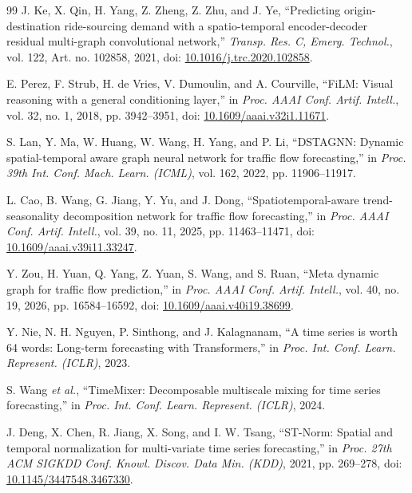 \begin{thebibliography}{99}
J. Ke, X. Qin, H. Yang, Z. Zheng, Z. Zhu, and J. Ye, ``Predicting origin-destination ride-sourcing demand with a spatio-temporal encoder-decoder residual multi-graph convolutional network,'' \emph{Transp. Res. C, Emerg. Technol.}, vol. 122, Art. no. 102858, 2021, doi: \href{https://doi.org/10.1016/j.trc.2020.102858}{10.1016/j.trc.2020.102858}.

E. Perez, F. Strub, H. de Vries, V. Dumoulin, and A. Courville, ``FiLM: Visual reasoning with a general conditioning layer,'' in \emph{Proc. AAAI Conf. Artif. Intell.}, vol. 32, no. 1, 2018, pp. 3942--3951, doi: \href{https://doi.org/10.1609/aaai.v32i1.11671}{10.1609/aaai.v32i1.11671}.

S. Lan, Y. Ma, W. Huang, W. Wang, H. Yang, and P. Li, ``DSTAGNN: Dynamic spatial-temporal aware graph neural network for traffic flow forecasting,'' in \emph{Proc. 39th Int. Conf. Mach. Learn. (ICML)}, vol. 162, 2022, pp. 11906--11917.

L. Cao, B. Wang, G. Jiang, Y. Yu, and J. Dong, ``Spatiotemporal-aware trend-seasonality decomposition network for traffic flow forecasting,'' in \emph{Proc. AAAI Conf. Artif. Intell.}, vol. 39, no. 11, 2025, pp. 11463--11471, doi: \href{https://doi.org/10.1609/aaai.v39i11.33247}{10.1609/aaai.v39i11.33247}.

Y. Zou, H. Yuan, Q. Yang, Z. Yuan, S. Wang, and S. Ruan, ``Meta dynamic graph for traffic flow prediction,'' in \emph{Proc. AAAI Conf. Artif. Intell.}, vol. 40, no. 19, 2026, pp. 16584--16592, doi: \href{https://doi.org/10.1609/aaai.v40i19.38699}{10.1609/aaai.v40i19.38699}.

Y. Nie, N. H. Nguyen, P. Sinthong, and J. Kalagnanam, ``A time series is worth 64 words: Long-term forecasting with Transformers,'' in \emph{Proc. Int. Conf. Learn. Represent. (ICLR)}, 2023.

S. Wang \emph{et al.}, ``TimeMixer: Decomposable multiscale mixing for time series forecasting,'' in \emph{Proc. Int. Conf. Learn. Represent. (ICLR)}, 2024.

J. Deng, X. Chen, R. Jiang, X. Song, and I. W. Tsang, ``ST-Norm: Spatial and temporal normalization for multi-variate time series forecasting,'' in \emph{Proc. 27th ACM SIGKDD Conf. Knowl. Discov. Data Min. (KDD)}, 2021, pp. 269--278, doi: \href{https://doi.org/10.1145/3447548.3467330}{10.1145/3447548.3467330}.

\end{thebibliography}
\endgroup
